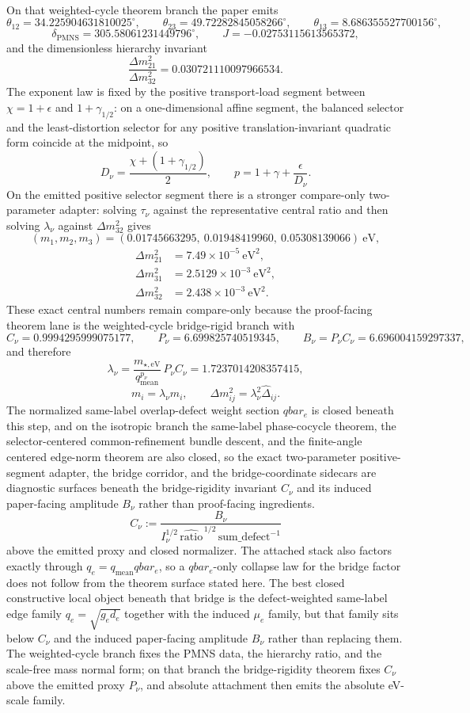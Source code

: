 \documentclass[11pt]{article}
\begin{document}
On that weighted-cycle theorem branch the paper emits
\[
\theta_{12}=34.225904631810025^\circ,\qquad
\theta_{23}=49.72282845058266^\circ,\qquad
\theta_{13}=8.686355527700156^\circ,
\]
\[
\delta_{\mathrm{PMNS}}=305.58061231449796^\circ,\qquad
J=-0.02753115613565372,
\]
and the dimensionless hierarchy invariant
\[
\frac{\Delta m_{21}^2}{\Delta m_{32}^2}=0.030721110097966534.
\]
The exponent law is fixed by the positive transport-load segment between
\(\chi=1+\epsilon\) and \(1+\gamma_{1/2}\): on a one-dimensional affine segment,
the balanced selector and the least-distortion selector for any positive
translation-invariant quadratic form coincide at the midpoint, so
\[
D_\nu=\frac{\chi+(1+\gamma_{1/2})}{2},
\qquad
p=1+\gamma+\frac{\epsilon}{D_\nu}.
\]
On the emitted positive selector segment there is a stronger compare-only two-parameter adapter: solving \(\tau_\nu\) against the representative central ratio and then solving \(\lambda_\nu\) against \(\Delta m_{32}^2\) gives
\[
(m_1,m_2,m_3)=(0.01745663295,\ 0.01948419960,\ 0.05308139066)\ \mathrm{eV},
\]
\[
\begin{aligned}
\Delta m_{21}^2&=7.49\times10^{-5}\ \mathrm{eV}^2,\\
\Delta m_{31}^2&=2.5129\times10^{-3}\ \mathrm{eV}^2,\\
\Delta m_{32}^2&=2.438\times10^{-3}\ \mathrm{eV}^2.
\end{aligned}
\]
These exact central numbers remain compare-only because the proof-facing theorem lane is the weighted-cycle bridge-rigid branch with
\[
C_\nu=0.9994295999075177,\qquad
P_\nu=6.699825740519345,\qquad
B_\nu=P_\nu C_\nu=6.696004159297337,
\]
and therefore
\[
\lambda_\nu=\frac{m_{\star,\mathrm{eV}}}{q_{\mathrm{mean}}^{p_\nu}}\,P_\nu C_\nu=1.7237014208357415,
\]
\[
m_i=\lambda_\nu \widehat m_i,
\qquad
\Delta m_{ij}^2=\lambda_\nu^2 \widehat{\Delta}_{ij}.
\]
The normalized same-label overlap-defect weight section \(qbar_e\) is closed beneath
this step, and on the isotropic branch the same-label phase-cocycle theorem, the
selector-centered common-refinement bundle descent, and the finite-angle centered edge-norm
theorem are also closed, so the exact two-parameter positive-segment adapter, the bridge corridor, and the bridge-coordinate sidecars are diagnostic surfaces beneath the bridge-rigidity invariant \(C_\nu\) and its induced paper-facing amplitude \(B_\nu\) rather than proof-facing ingredients.
\[
C_\nu:=\frac{B_\nu}{I_\nu^{1/2}\,\widehat{\mathrm{ratio}}^{\,1/2}\,\mathrm{sum\_defect}^{-1}}
\]
above the emitted proxy and closed normalizer. The attached stack also factors exactly through
\(q_e = q_{\mathrm{mean}} qbar_e\), so a \(qbar_e\)-only collapse law for the bridge factor does
not follow from the theorem surface stated here. The best closed constructive local object beneath that bridge is the
defect-weighted same-label edge family \(q_e=\sqrt{g_e d_e}\) together with the induced
\(\mu_e\) family, but that family sits below \(C_\nu\) and the induced paper-facing amplitude \(B_\nu\) rather than replacing them.
The weighted-cycle branch fixes the PMNS data, the hierarchy ratio, and the
scale-free mass normal form; on that branch the bridge-rigidity theorem fixes
\(C_\nu\) above the emitted proxy \(P_\nu\), and absolute attachment then emits the
absolute eV-scale family.
\end{document}
